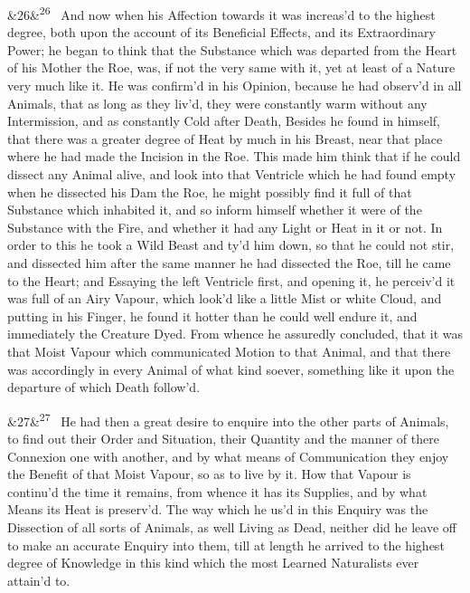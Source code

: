 \documentclass[12pt]{article}
\newcommand{\para}[1][]{\par\noindent\ifx&#1&\else\textsuperscript{\footnotesize #1}~\fi}
\begin{document}
\para[26] And now when his Affection towards it was increas'd to the highest degree, both upon the account of its Beneficial Effects, and its Extraordinary Power; he began to think that the Substance which was departed from the Heart of his Mother the Roe, was, if not the very same with it, yet at least of a Nature very much like it. He was confirm'd in his Opinion, because he had observ'd in all Animals, that as long as they liv'd, they were constantly warm without any Intermission, and as constantly Cold after Death, Besides he found in himself, that there was a greater degree of Heat by much in his Breast, near that place where he had made the Incision in the Roe. This made him think that if he could dissect any Animal alive, and look into that Ventricle which he had found empty when he dissected his Dam the Roe, he might possibly find it full of that Substance which inhabited it, and so inform himself whether it were of the Substance with the Fire, and whether it had any Light or Heat in it or not. In order to this he took a Wild Beast and ty'd him down, so that he could not stir, and dissected him after the same manner he had dissected the Roe, till he came to the Heart; and Essaying the left Ventricle first, and opening it, he perceiv'd it was full of an Airy Vapour, which look'd like a little Mist or white Cloud, and putting in his Finger, he found it hotter than he could well endure it, and immediately the Creature Dyed. From whence he assuredly concluded, that it was that Moist Vapour which communicated Motion to that Animal, and that there was accordingly in every Animal of what kind soever, something like it upon the departure of which Death follow'd.

\para[27] He had then a great desire to enquire into the other parts of Animals, to find out their Order and Situation, their Quantity and the manner of there Connexion one with another, and by what means of Communication they enjoy the Benefit of that Moist Vapour, so as to live by it. How that Vapour is continu'd the time it remains, from whence it has its Supplies, and by what Means its Heat is preserv'd. The way which he us'd in this Enquiry was the Dissection of all sorts of Animals, as well Living as Dead, neither did he leave off to make an accurate Enquiry into them, till at length he arrived to the highest degree of Knowledge in this kind which the most Learned Naturalists ever attain'd to.
\end{document}
